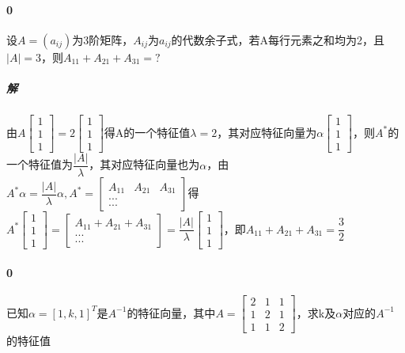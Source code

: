 \paragraph{0}
设\(A = (a_{ij})\)为3阶矩阵，\(A_{ij}\)为\(a_{ij}\)的代数余子式，若A每行元素之和均为2，且\(|A| = 3\)，则\(A_{11} + A_{21} + A_{31} = ?\)

\subparagraph{解}
由\(A\begin{bmatrix}
    1 \\ 
    1 \\ 
    1
\end{bmatrix} = 2\begin{bmatrix}
    1 \\ 
    1 \\ 
    1
\end{bmatrix}\)得A的一个特征值\(\lambda = 2\)，其对应特征向量为\(\alpha\begin{bmatrix}
    1 \\ 
    1 \\ 
    1
\end{bmatrix}\)，则\(A^*\)的一个特征值为\(\dfrac{|A|}{\lambda}\)，其对应特征向量也为\(\alpha\)，由\(A^*\alpha = \dfrac{|A|}{\lambda}\alpha, A^* = \begin{bmatrix}
    A_{11} & A_{21} & A_{31} \\
    ... \\
    ...
\end{bmatrix}\)得\(A^*\begin{bmatrix}
    1 \\ 
    1 \\ 
    1
\end{bmatrix} = \begin{bmatrix}
    A_{11} + A_{21} + A_{31} \\ 
    ... \\ 
    ...
\end{bmatrix} = \dfrac{|A|}{\lambda}\begin{bmatrix}
    1 \\ 
    1 \\ 
    1
\end{bmatrix}\)，即\(A_{11} + A_{21} + A_{31} = \dfrac{3}{2}\)

\paragraph{0}
已知\(\alpha = [1, k, 1]^T\)是\(A^{-1}\)的特征向量，其中\(A = \begin{bmatrix}
    2 & 1 & 1 \\ 
    1 & 2 & 1 \\ 
    1 & 1 & 2
\end{bmatrix}\)，求k及\(\alpha\)对应的\(A^{-1}\)的特征值

